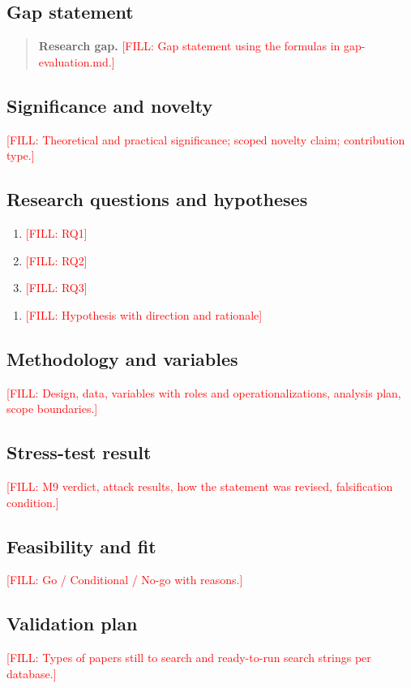 \documentclass[11pt]{article}
\newcommand{\fillin}[1]{\textcolor{red}{[FILL: #1]}}
\begin{document}
\subsection{Gap statement}
\begin{quote}
\textbf{Research gap.} \fillin{Gap statement using the formulas in gap-evaluation.md.}
\end{quote}

\subsection{Significance and novelty}
\fillin{Theoretical and practical significance; scoped novelty claim; contribution type.}

\subsection{Research questions and hypotheses}
\begin{enumerate}[label=\textbf{RQ\arabic*.}, leftmargin=*]
  \item \fillin{RQ1}
  \item \fillin{RQ2}
  \item \fillin{RQ3}
\end{enumerate}
\begin{enumerate}[label=\textbf{H\arabic*.}, leftmargin=*]
  \item \fillin{Hypothesis with direction and rationale}
\end{enumerate}

\subsection{Methodology and variables}
\fillin{Design, data, variables with roles and operationalizations, analysis plan, scope boundaries.}

\subsection{Stress-test result}
\fillin{M9 verdict, attack results, how the statement was revised, falsification condition.}

\subsection{Feasibility and fit}
\fillin{Go / Conditional / No-go with reasons.}

\subsection{Validation plan}
\fillin{Types of papers still to search and ready-to-run search strings per database.}
\end{document}
